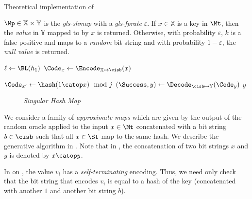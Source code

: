 \documentclass{article}
\begin{document}
\begin{algorithm}[h]
    \caption{Theoretical implementation of \protect\Find}
    \label{alg:shmapfind}
    \KwIn
    {
        $\Mp \in \mathbb{X} \times \mathbb{Y}$ is the \emph{\gls{gls-shmap}} with a \emph{\gls{gls-fprate}} $\varepsilon$.
    }
    \KwOut
    {
        If $x \in \mathbb{X}$ is a key in $\Mt$, then the \emph{value} in $\mathbb{Y}$ mapped to by $x$ is returned. Otherwise, with probability $\varepsilon$, $k$ is a false positive and maps to a \emph{random} bit string and with probability $1-\varepsilon$, the \emph{null value} is returned.
    }
    
    {
        $\ell \gets \BL(h_1)$\;
        $\Code_x \gets \Encode_{\mathbb{X} \mapsto \cisb}(x)$\;
        {
            \Return \nullvalue\;
        }
        
        
        $\Code_{x'} \gets \hash(1 \catop x) \mod j$\;
        $(\Success, y) \gets \Decode_{\cisb \mapsto \mathbb{Y}}(\Code_y)$\;
        \If{\Success}
        {
            \Return $y$\;
        }
    }
\end{algorithm}


\begin{figure}
    \centering
    \caption{\emph{Singular Hash Map}}
    \label{fig:shmap}
\end{figure}

We consider a family of \emph{approximate maps} which are given by the output of the random oracle applied to the input $x \in \Mt$ concatenated with a bit string $b \in \cisb$ such that all $x \in \St$ map to the same hash. We describe the generative algorithm in . Note that in , the concatenation of two bit strings $x$ and $y$ is denoted by $x \catop y$.


In  on , the value $v_i$ has a \emph{self-terminating} encoding. Thus, we need only check that the bit string that encodes $v_i$ is equal to a hash of the key (concatenated with another $1$ and another bit string $b$).
\end{document}
